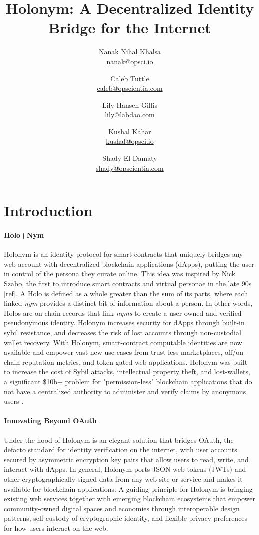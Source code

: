 \documentclass[11pt,oneside,a4paper]{article}
\title{Holonym: A Decentralized Identity Bridge for the Internet}
\author{Nanak Nihal Khalsa \\ \href{mailto:nanak@opsci.io}{nanak@opsci.io} 
    \and Caleb Tuttle \\ \href{mailto:caleb@opscientia.com}{caleb@opscientia.com}
	\and Lily Hansen-Gillis \\ \href{mailto:lily@labdao.com}{lily@labdao.com}
	\and Kushal Kahar \\ \href{mailto:kushal@opsci.io}{kushal@opsci.io}
    \and Shady El Damaty \\ \href{mailto:shady@opsci.io}{shady@opscientia.com}}
\begin{document}
\maketitle
\section*{Introduction}
	 \paragraph{Holo+Nym} Holonym is an identity protocol for smart contracts that uniquely bridges any web account with decentralized blockchain applications (dApps), putting the user in control of the persona they curate online. This idea was inspired by Nick Szabo, the first to introduce smart contracts and virtual personae in the late 90s [ref]. A Holo is defined as a whole greater than the sum of its parts, where each linked \textit{nym} provides a distinct bit of information about a person. In other words, Holos are on-chain records that link \textit{nyms} to create a user-owned and verified pseudonymous identity.  Holonym increases security for dApps through built-in sybil resistance, and decreases the risk of lost accounts through non-custodial wallet recovery. With Holonym, smart-contract computable identities are now available and empower vast new use-cases from trust-less marketplaces, off/on-chain reputation metrics, and token gated web applications. Holonym was built to increase the cost of Sybil attacks, intellectual property theft, and lost-wallets, a significant \$10b+ problem for "permission-less" blockchain applications that do not have a centralized authority to administer and verify claims by anonymous users \cite{opensea_tweet, dune_anal}.  
	\paragraph{Innovating Beyond OAuth} Under-the-hood of Holonym is an elegant solution that bridges OAuth, the defacto standard for identity verification on the internet, with user accounts secured by asymmetric encryption key pairs that allow users to read, write, and interact with dApps. In general, Holonym ports JSON web tokens (JWTs) and other cryptographically signed data from any web site or service and makes it available for blockchain applications. A guiding principle for Holonym is bringing existing web services together with emerging blockchain ecosystems that empower  community-owned digital spaces and economies through interoperable design patterns, self-custody of cryptographic identity, and flexible privacy preferences for how users interact on the web.
\end{document}
